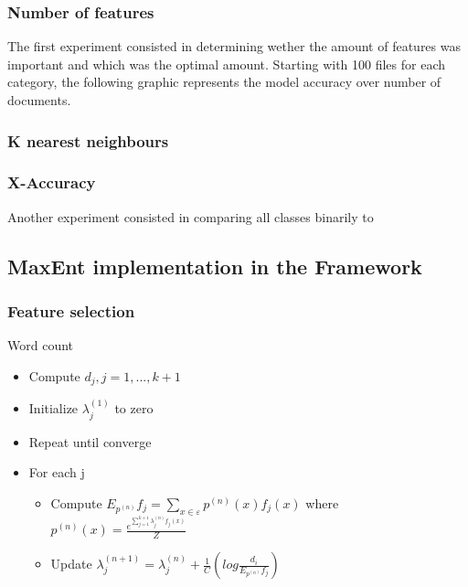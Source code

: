 \subsubsection{Number of features}
The first experiment consisted in determining wether the amount of features was important and which was the optimal amount. Starting with 100 files for each category, the following graphic
represents the model accuracy over number of documents. 

\subsubsection{K nearest neighbours}

\subsubsection{X-Accuracy}
Another experiment consisted in comparing all classes binarily to  




\subsection{MaxEnt implementation in the Framework}


\subsubsection{Feature selection}
Word count

\begin{itemize}
\item Compute $d_j, j=1,...,k+1$
\item Initialize $\lambda_j^{(1)}$ to zero
\item Repeat until converge
\item For each j 
  \begin{itemize}
  \item Compute $E_{p^{(n)}} f_j = \sum\limits_{x \in \varepsilon} p^{(n)} (x)f_j(x)$
    where $p^{(n)}(x) = \frac{e^{\sum\limits_{j=1}^{k+1}\lambda_j^{(n)}f_j(x)}}{Z}$ 
  \item Update $\lambda_j^{(n+1)} = \lambda_j^{(n)} + \frac{1}{C}(log\frac{d_i}{E_{{p^{(n)}}}f_j})$
  \end{itemize}
\end{itemize}

